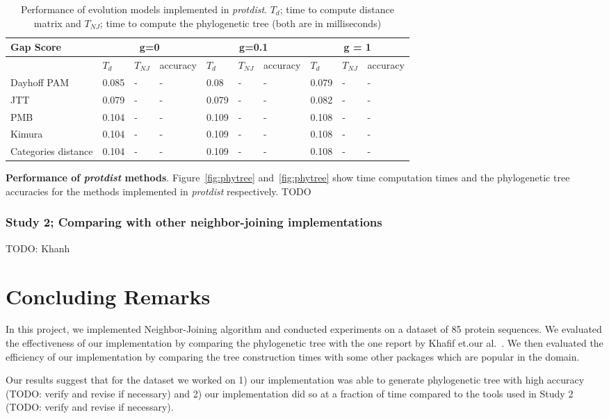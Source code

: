 \documentclass[11pt,letterpaper]{article}
\theoremstyle{definition}
\begin{document}
\begin{table}[!h]
\centering
	\begin{tabular}{l|lll|lll|lll}

Gap Score	& \multicolumn{3}{c}{g=0} & \multicolumn{3}{c}{g=0.1} &  \multicolumn{3}{c}{g = 1} \\
\hline
&	$T_d$	& $T_{NJ}$	& accuracy &	$T_d$	& $T_{NJ}$	& accuracy &	$T_d$	& $T_{NJ}$	& accuracy \\
\hline
Dayhoff PAM		&	0.085	&	-	&	-	&	0.08	&	-	&	-	&	0.079	&	-	&	-	\\
JTT	&	0.079	&	-	&	-	&	0.079	&	-	&	-	&	0.082	&	-	&	-	\\
PMB	&	0.104	&	-	&	-	&	0.109	&	-	&	-	&	0.108	&	-	&	-	\\
Kimura	&	0.104	&	-	&	-	&	0.109	&	-	&	-	&	0.108	&	-	&	-	\\
Categories distance	&	0.104	&	-	&	-	&	0.109	&	-	&	-	&	0.108	&	-	&	-	\\
\hline
\end{tabular}
\caption{Performance of evolution models implemented in \textit{protdist}. 
$T_d$; time to compute distance matrix and $T_{NJ}$; time to compute the phylogenetic tree (both are in milliseconds)}\label{tab:dist1}
\end{table}

\textbf{Performance of \textit{protdist} methods}. Figure~\ref{fig:phytree} and~\ref{fig:phytree} show time computation times and the phylogenetic tree accuracies for the methods implemented in \textit{protdist} respectively. TODO 

\subsubsection{Study 2; Comparing with other neighbor-joining implementations}
 
TODO: Khanh 

\section{Concluding Remarks}

In this project, we implemented Neighbor-Joining algorithm and conducted experiments on a dataset of 85 protein sequences. We evaluated the effectiveness of our implementation by comparing the phylogenetic tree with the one report by Khafif et.our  al.~\cite{khafif2014identification}. We then evaluated the efficiency of our implementation by comparing the tree construction times with some other packages which are popular in the domain.

Our results suggest that for the dataset we worked on 1) our implementation was able to generate phylogenetic tree with high accuracy (TODO: verify and revise if necessary) and 2) our implementation did so at a fraction of time compared to the tools used in Study 2 (TODO: verify and revise if necessary).



\end{document}
